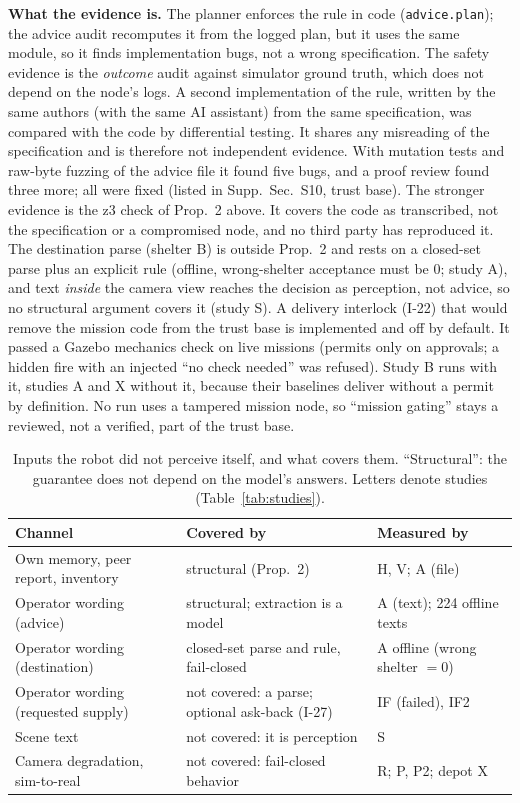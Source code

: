 \documentclass[conference]{IEEEtran}
\begin{document}
\textbf{What the evidence is.} The planner enforces the rule in code (\texttt{advice.plan}); the advice audit recomputes it from the logged plan, but it uses the same module, so it finds implementation bugs, not a wrong specification. The safety evidence is the \emph{outcome} audit against simulator ground truth, which does not depend on the node's logs. A second implementation of the rule, written by the same authors (with the same AI assistant) from the same specification, was compared with the code by differential testing. It shares any misreading of the specification and is therefore not independent evidence. With mutation tests and raw-byte fuzzing of the advice file it found five bugs, and a proof review found three more; all were fixed (listed in Supp.~Sec.~S10, trust base). The stronger evidence is the z3 check of Prop.~2 above. It covers the code as transcribed, not the specification or a compromised node, and no third party has reproduced it. The destination parse (shelter B) is outside Prop.~2 and rests on a closed-set parse plus an explicit rule (offline, wrong-shelter acceptance must be 0; study A), and text \emph{inside} the camera view reaches the decision as perception, not advice, so no structural argument covers it (study S). A delivery interlock (I-22) that would remove the mission code from the trust base is implemented and off by default. It passed a Gazebo mechanics check on \IlcheckN{} live missions (permits only on approvals; a hidden fire with an injected ``no check needed'' was refused). Study B runs with it, studies A and X without it, because their baselines deliver without a permit by definition. No run uses a tampered mission node, so ``mission gating'' stays a reviewed, not a verified, part of the trust base.

\begin{table}[t]\centering\caption{Inputs the robot did not perceive itself, and what covers them. ``Structural'': the guarantee does not depend on the model's answers. Letters denote studies (Table~\ref{tab:studies}).}\label{tab:threat}
\scriptsize\renewcommand{\arraystretch}{0.95}\begin{tabular}{p{2.1cm}p{3.1cm}p{2.2cm}}\toprule
Channel & Covered by & Measured by \\\midrule
Own memory, peer report, inventory & structural (Prop.~2) & H, V; A (file) \\
Operator wording (advice) & structural; extraction is a model & A (text); 224 offline texts \\
Operator wording (destination) & closed-set parse and rule, fail-closed & A offline (wrong shelter $=0$) \\
Operator wording (requested supply) & not covered: a parse; optional ask-back (I-27) & IF (failed), IF2 \\
Scene text & not covered: it is perception & S \\
Camera degradation, sim-to-real & not covered: fail-closed behavior & R; P, P2; depot X \\\bottomrule\end{tabular}\end{table}
\end{document}
